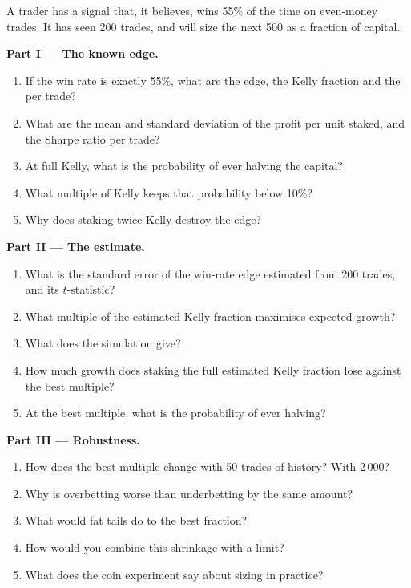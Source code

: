 \begin{problem}\label{pb:m2:thinking-in-expected-value:1}
A trader has a signal that, it believes, wins 55\% of the time on even-money trades. It
has seen 200 trades, and will size the next 500 as a fraction of capital.

\medskip\noindent\textbf{Part I --- The known edge.}
\begin{enumerate}
\item If the win rate is exactly 55\%, what are the edge, the Kelly fraction and the  per trade?
\item What are the mean and standard deviation of the profit per unit staked, and the
Sharpe ratio per trade?
\item At full Kelly, what is the probability of ever halving the capital?
\item What multiple of Kelly keeps that probability below 10\%?
\item Why does staking twice Kelly destroy the edge?
\end{enumerate}

\medskip\noindent\textbf{Part II --- The estimate.}
\begin{enumerate}[resume]
\item What is the standard error of the win-rate edge estimated from 200 trades, and its
$t$-statistic?
\item What multiple of the estimated Kelly fraction maximises expected growth?
\item What does the simulation give?
\item How much growth does staking the full estimated Kelly fraction lose against the best
multiple?
\item At the best multiple, what is the probability of ever halving?
\end{enumerate}

\medskip\noindent\textbf{Part III --- Robustness.}
\begin{enumerate}[resume]
\item How does the best multiple change with 50 trades of history? With 2\,000?
\item Why is overbetting worse than underbetting by the same amount?
\item What would fat tails do to the best fraction?
\item How would you combine this shrinkage with a  limit?
\item What does the coin experiment say about sizing in practice?
\end{enumerate}


\end{problem}
